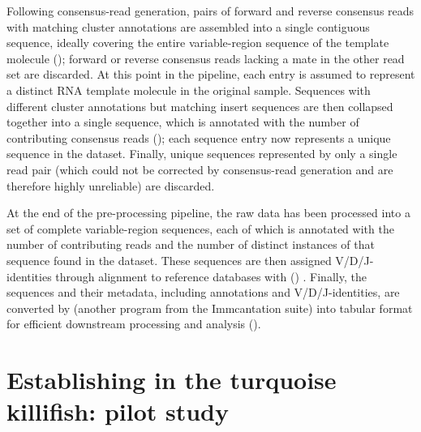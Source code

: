 Following consensus-read generation, pairs of forward and reverse consensus reads with matching cluster annotations are assembled into a single contiguous sequence, ideally covering the entire variable-region sequence of the template molecule (); forward or reverse consensus reads lacking a mate in the other read set are discarded. At this point in the pipeline, each entry is assumed to represent a distinct RNA template molecule in the original sample. Sequences with different cluster annotations but matching insert sequences are then collapsed together into a single sequence, which is annotated with the number of contributing consensus reads (); each sequence entry now represents a unique sequence in the dataset. Finally, unique sequences represented by only a single read pair (which could not be corrected by consensus-read generation and are therefore highly unreliable) are discarded.

At the end of the  pre-processing pipeline, the raw data has been processed into a set of complete variable-region sequences, each of which is annotated with the number of contributing reads and the number of distinct instances of that sequence found in the dataset. These sequences are then assigned V/D/J-identities through alignment to reference databases with  () \parencite{ye2013igblast}. Finally, the sequences and their metadata, including annotations and V/D/J-identities, are converted by  (another program from the Immcantation suite) \parencite{gupta2015changeo} into tabular format for efficient downstream processing and analysis ().

\FloatBarrier
\clearpage

\section{Establishing \igseq in the turquoise killifish: pilot study}
\label{sec:igseq_pilot}

